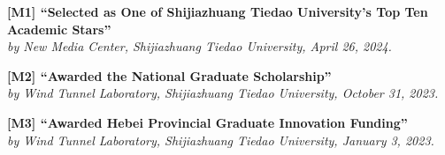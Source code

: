 
\begin{cvparagraph}

  \noindent\textbf{[M1] ``Selected as One of Shijiazhuang Tiedao University's Top Ten Academic Stars''}\\
  \textit{by New Media Center, Shijiazhuang Tiedao University, April 26, 2024.}

  \vspace{0.45em}

  \noindent\textbf{[M2] ``Awarded the National Graduate Scholarship''}\\
  \textit{by Wind Tunnel Laboratory, Shijiazhuang Tiedao University, October 31, 2023.}

  \vspace{0.45em}

  \noindent\textbf{[M3] ``Awarded Hebei Provincial Graduate Innovation Funding''}\\
  \textit{by Wind Tunnel Laboratory, Shijiazhuang Tiedao University, January 3, 2023.}
  
\end{cvparagraph}
